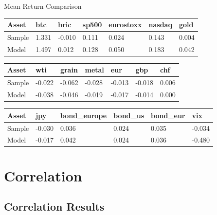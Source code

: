 \documentclass{beamer}
\newcommand\SmallerFont{\fontsize{8}{10}\selectfont}
\begin{document}
\begin{frame}{ Mean Return Comparison}
\SmallerFont
\begin{table}[]
\begin{tabular}{lllllll}
\toprule
Asset & btc & bric & sp500 & eurostoxx & nasdaq & gold \\
\midrule
Sample & 1.331 & -0.010 & 0.111 & 0.024 & 0.143 & 0.004 \\
Model & 1.497 & 0.012 & 0.128 & 0.050 & 0.183 & 0.042 \\
\bottomrule
\end{tabular}
\end{table}

\begin{table}[]
\begin{tabular}{lllllll}
\toprule
Asset & wti & grain & metal & eur & gbp & chf \\
\midrule
Sample & -0.022 & -0.062 & -0.028 & -0.013 & -0.018 & 0.006 \\
Model & -0.038 & -0.046 & -0.019 & -0.017 & -0.014 & 0.000 \\
\bottomrule
\end{tabular}
\end{table}

\begin{table}[]
\begin{tabular}{llllll}
\toprule
Asset & jpy & bond\_europe & bond\_us & bond\_eur & vix \\
\midrule
Sample & -0.030 & 0.036 & 0.024 & 0.035 & -0.034 \\
Model & -0.017 & 0.042 & 0.024 & 0.036 & -0.480 \\
\bottomrule
\end{tabular}

\end{table}
\end{frame}



\section{Correlation}
\subsection{Correlation Results}
\end{document}
